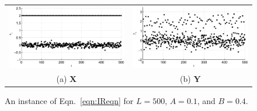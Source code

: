 \documentclass{article}[10pt]
\begin{document}
\begin{figure}[ht]
\begin{tabular}{cc}
\includegraphics[scale=0.48]{NoisyResponseExample_X.eps} & \includegraphics[scale=0.48]{NoisyResponseExample_Y.eps} \\
(a) $\mathbf{X}$ & (b) $\mathbf{Y}$
\end{tabular}
\caption{An instance of Eqn.\ \ref{eqn:IReqn} for $L=500$, $A=0.1$, and $B=0.4$.}
\label{fig:IRxyplot}
\end{figure}
\end{document}
